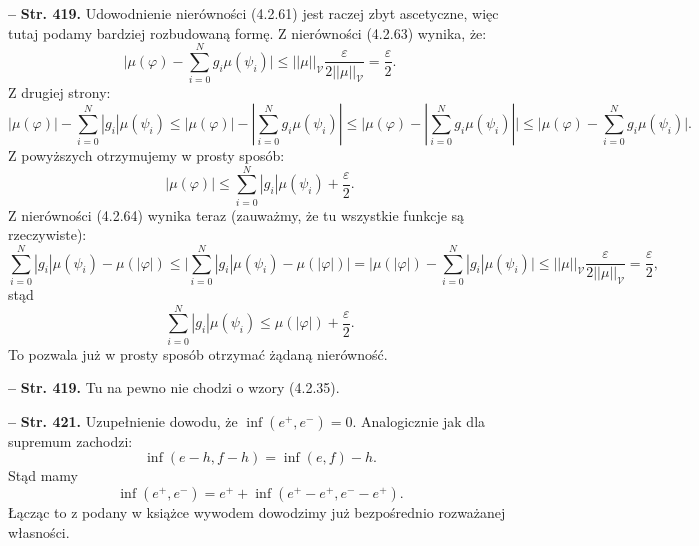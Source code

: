 \documentclass[a4paper]{article}
\newcommand{\tb}{\textbf}
\newcommand{\noi}{\noindent}
\newcommand{\start}{\noi \tb{--} {}}
\newcommand{\Str}[1]{\tb{Str. #1.}}
\begin{document}
\start \Str{419} Udowodnienie nierówności (4.2.61) jest raczej zbyt
ascetyczne, więc tutaj podamy bardziej rozbudowaną formę. Z
nierówności (4.2.63) wynika, że:
\begin{displaymath}
  \big| \mu( \varphi ) - \sum_{ i = 0 }^{ N } g_{ i } \mu( \psi_{ i } )
  \big| \leq || \mu ||_{ \mathcal{V} } \frac{ \varepsilon }{ 2 ||
    \mu ||_{ \mathcal{V} } } = \frac{ \varepsilon }{ 2 }.
\end{displaymath}
Z drugiej strony:
\begin{displaymath}
  | \mu( \varphi ) | - \sum_{ i = 0 }^{ N } | g_{ i } | \mu( \psi_{ i } )
  \leq | \mu( \varphi ) | - | \sum_{ i = 0 }^{ N } g_{ i }
  \mu( \psi_{ i } ) | \leq \bigg| \mu( \varphi ) - | \sum_{ i = 0 }^{ N }
  g_{ i } \mu( \psi_{ i } ) | \bigg| \leq \bigg| \mu( \varphi )
  - \sum_{ i = 0 }^{ N } g_{ i } \mu( \psi_{ i } ) \bigg|.
\end{displaymath}
Z powyższych otrzymujemy w prosty sposób:
\begin{displaymath}
  | \mu( \varphi ) | \leq \sum_{ i = 0 }^{ N } | g_{ i } |
  \mu( \psi_{ i } ) + \frac{ \varepsilon }{ 2 }.
\end{displaymath}
Z nierówności (4.2.64) wynika teraz (zauważmy, że tu wszystkie funkcje
są rzeczywiste):
\begin{displaymath}
  \sum_{ i = 0 }^{ N } | g_{ i } | \mu( \psi_{ i } ) - \mu( | \varphi | )
  \leq \bigg| \sum_{ i = 0 }^{ N } | g_{ i } | \mu( \psi_{ i } )
  - \mu( | \varphi | ) \bigg| = \bigg| \mu( | \varphi | )
  - \sum_{ i = 0 }^{ N } | g_{ i } | \mu( \psi_{ i } ) \bigg| \leq ||
  \mu ||_{ \mathcal{V} } \frac{ \varepsilon }{ 2 ||
    \mu ||_{ \mathcal{V} } } = \frac{ \varepsilon }{ 2 },
\end{displaymath}
stąd
\begin{displaymath}
  \sum_{ i = 0 }^{ N } | g_{ i } | \mu( \psi_{ i } )
  \leq \mu( | \varphi | ) + \frac{ \varepsilon }{ 2 }.
\end{displaymath}
To pozwala już w prosty sposób otrzymać żądaną nierówność.

\start \Str{419} Tu na pewno nie chodzi o wzory (4.2.35).

\start \Str{421} Uzupełnienie dowodu, że
$\inf( e^{ + }, e^{ - } ) = 0$. Analogicznie jak dla supremum
zachodzi:
\begin{displaymath}
  \inf( e - h, f - h ) = \inf( e, f ) - h.
\end{displaymath}
Stąd mamy
\begin{displaymath}
  \inf( e^{ + }, e^{ - } ) = e^{ + } + \inf( e^{ + } - e^{ + }, 
  e^{ - } - e^{ + } ).
\end{displaymath}
Łącząc to z podany w książce wywodem dowodzimy już bezpośrednio
rozważanej własności.
\end{document}
